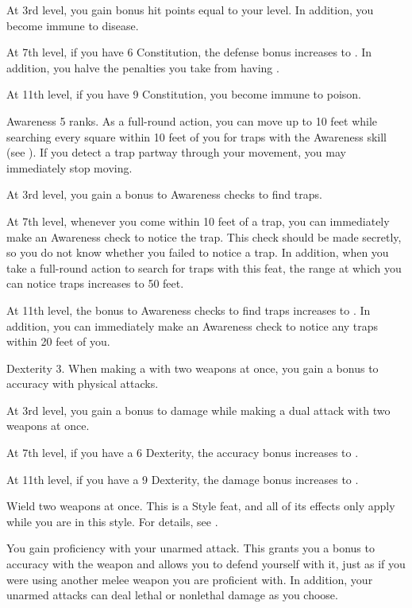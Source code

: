     At 3rd level, you gain bonus hit points equal to your level.
    In addition, you become immune to disease.

    At 7th level, if you have 6 Constitution, the defense bonus increases to .
    In addition, you halve the penalties you take from having .

    At 11th level, if you have 9 Constitution, you become immune to poison.

    \featpre Awareness 5 ranks.
    \featben As a full-round action, you can move up to 10 feet while searching every square within 10 feet of you for traps with the Awareness skill (see ).
    If you detect a trap partway through your movement, you may immediately stop moving.

    At 3rd level, you gain a  bonus to Awareness checks to find traps.

    At 7th level, whenever you come within 10 feet of a trap, you can immediately make an Awareness check to notice the trap.
    This check should be made secretly, so you do not know whether you failed to notice a trap.
    In addition, when you take a full-round action to search for traps with this feat, the range at which you can notice traps increases to 50 feet.

    At 11th level, the bonus to Awareness checks to find traps increases to .
    In addition, you can immediately make an Awareness check to notice any traps within 20 feet of you.

    \featpre Dexterity 3.
    \featben When making a  with two weapons at once, you gain a  bonus to accuracy with physical attacks.

    At 3rd level, you gain a  bonus to damage while making a dual attack with two weapons at once.

    At 7th level, if you have a 6 Dexterity, the accuracy bonus increases to .

    At 11th level, if you have a 9 Dexterity, the damage bonus increases to .

    \stylereq Wield two weapons at once.
     This is a Style feat, and all of its effects only apply while you are in this style.
    For details, see .

    \featben You gain proficiency with your unarmed attack.
    This grants you a  bonus to accuracy with the weapon and allows you to defend yourself with it, just as if you were using another melee weapon you are proficient with.
    In addition, your unarmed attacks can deal lethal or nonlethal damage as you choose.

